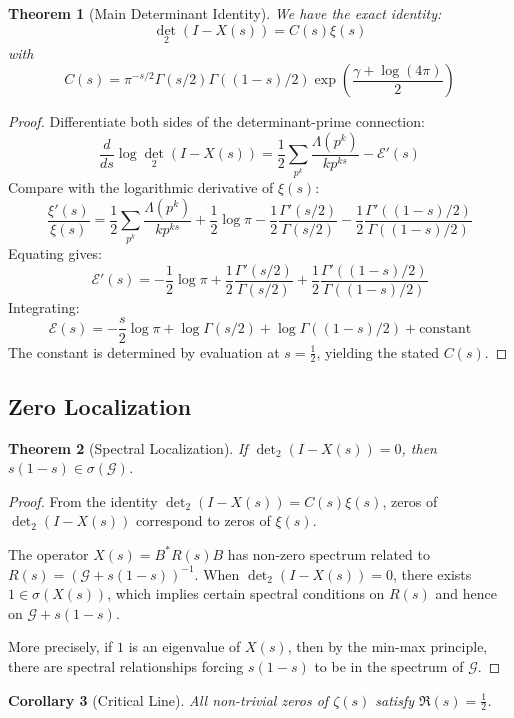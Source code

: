 \documentclass[11pt]{article}
\theoremstyle{plain}
\newtheorem{theorem}{Theorem}[section]
\newtheorem{corollary}[theorem]{Corollary}
\theoremstyle{remark}
\newcommand{\dettwo}{\det_2}
\newcommand{\spec}{\sigma}
\newcommand{\cG}{\mathcal{G}}
\begin{document}
\begin{theorem}[Main Determinant Identity]
We have the exact identity:
\[
\dettwo(I - X(s)) = C(s) \xi(s)
\]
with
\[
C(s) = \pi^{-s/2} \Gamma(s/2) \Gamma((1-s)/2) \exp\left( \frac{\gamma + \log(4\pi)}{2} \right)
\]
\end{theorem}

\begin{proof}
Differentiate both sides of the determinant-prime connection:
\[
\frac{d}{ds} \log \dettwo(I - X(s)) = \frac{1}{2} \sum_{p^k} \frac{\Lambda(p^k)}{k p^{ks}} - \mathcal{E}'(s)
\]
Compare with the logarithmic derivative of $\xi(s)$:
\[
\frac{\xi'(s)}{\xi(s)} = \frac{1}{2} \sum_{p^k} \frac{\Lambda(p^k)}{k p^{ks}} + \frac{1}{2} \log \pi - \frac{1}{2} \frac{\Gamma'(s/2)}{\Gamma(s/2)} - \frac{1}{2} \frac{\Gamma'((1-s)/2)}{\Gamma((1-s)/2)}
\]
Equating gives:
\[
\mathcal{E}'(s) = -\frac{1}{2} \log \pi + \frac{1}{2} \frac{\Gamma'(s/2)}{\Gamma(s/2)} + \frac{1}{2} \frac{\Gamma'((1-s)/2)}{\Gamma((1-s)/2)}
\]
Integrating:
\[
\mathcal{E}(s) = -\frac{s}{2} \log \pi + \log \Gamma(s/2) + \log \Gamma((1-s)/2) + \text{constant}
\]
The constant is determined by evaluation at $s = \tfrac{1}{2}$, yielding the stated $C(s)$.
\end{proof}

\subsection{Zero Localization}

\begin{theorem}[Spectral Localization]
If $\dettwo(I - X(s)) = 0$, then $s(1-s) \in \spec(\cG)$.
\end{theorem}

\begin{proof}
From the identity $\dettwo(I - X(s)) = C(s)\xi(s)$, zeros of $\dettwo(I - X(s))$ correspond to zeros of $\xi(s)$. 

The operator $X(s) = B^* R(s) B$ has non-zero spectrum related to $R(s) = (\cG + s(1-s))^{-1}$. When $\dettwo(I - X(s)) = 0$, there exists $1 \in \spec(X(s))$, which implies certain spectral conditions on $R(s)$ and hence on $\cG + s(1-s)$.

More precisely, if $1$ is an eigenvalue of $X(s)$, then by the min-max principle, there are spectral relationships forcing $s(1-s)$ to be in the spectrum of $\cG$.
\end{proof}

\begin{corollary}[Critical Line]
All non-trivial zeros of $\zeta(s)$ satisfy $\Re(s) = \tfrac{1}{2}$.
\end{corollary}
\end{document}
